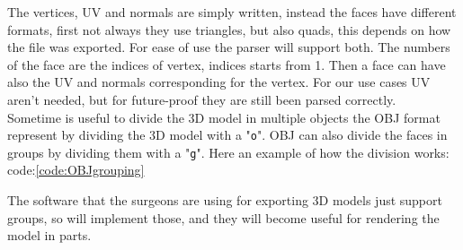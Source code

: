 
\noindent
The vertices, UV and normals are simply written, instead the faces have different formats, first not always they use triangles, but also quads, this depends on how the file was exported.
For ease of use the parser will support both. The numbers of the face are the indices of vertex, indices starts from 1.
Then a face can have also the UV and normals corresponding for the vertex. For our use cases UV aren't needed, but for future-proof they are still been parsed correctly.\\
Sometime is useful to divide the 3D model in multiple objects the OBJ format represent by dividing the 3D model with a "\verb|o|".
OBJ can also divide the faces in groups by dividing them with a "\verb|g|".
Here an example of how the division works: code:\ref{code:OBJgrouping}


\noindent
The software that the surgeons are using for exporting 3D models just support groups, so will implement those, and they will become useful for rendering the model in parts.

